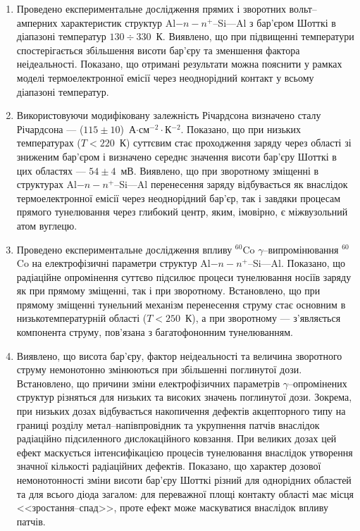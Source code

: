   \begin{enumerate}[leftmargin=0cm,itemindent=3em]
     \item Проведено експериментальне дослідження прямих і зворотних вольт--амперних характеристик структур Al$-n-n^+$--Si---Al з бар'єром Шотткі в діапазоні температур $130\div330$~К.
Виявлено, що при підвищенні температури спостерігається збільшення висоти бар'єру та зменшення фактора неідеальності.
       Показано, що отримані результати можна пояснити у рамках моделі термоелектронної емісії через неоднорідний контакт у всьому діапазоні температур.

     \item Використовуючи модифіковану залежність Річардсона визначено сталу Річардсона --- ($115\pm10$)~А$\cdot$см$^{-2}\cdot$К$^{-2}$.
         Показано, що при низьких температурах ($T<220$~К) суттєвим стає проходження заряду через області зі зниженим бар'єром і визначено середнє значення висоти бар'єру Шотткі в цих областях --- $54\pm4$~мВ.
     Виявлено, що при зворотному зміщенні в структурах Al$-n-n^+$--Si---Al перенесення заряду відбувається як внаслідок термоелектронної емісії через неоднорідний бар'єр, так і завдяки процесам прямого тунелювання через глибокий центр,
          яким, імовірно, є міжвузольний атом вуглецю.

\item Проведено експериментальне дослідження впливу $^{60}$Co $\gamma$--ви\-про\-мі\-ню\-ван\-ня $^{60}$Co на електрофізичні параметри структур Al$-n-n^+$--Si---Al.
     Показано, що радіаційне опромінення суттєво підсилює процеси тунелювання носіїв заряду як при прямому зміщенні, так і при зворотному.
     Встановлено, що при прямому зміщенні тунельний механізм перенесення струму стає основним в низькотемпературній області ($T<250$~К),
а при зворотному --- з'являється компонента струму, пов'язана з багатофононним тунелюванням.


\item Виявлено, що висота бар'єру, фактор неідеальності та величина зворотного струму немонотонно змінюються при збільшенні поглинутої дози.
Встановлено, що причини зміни електрофізичних параметрів $\gamma$--оп\-ро\-мі\-не\-них структур різняться для низьких та високих значень поглинутої дози.
      Зокрема, при низьких дозах відбувається накопичення дефектів акцепторного типу на границі розділу
метал--напівпровідник та укрупнення патчів внаслідок радіаційно підсиленного дислокаційного ковзання.
 При великих дозах цей ефект маскується інтенсифікацією процесів тунелювання внаслідок утворення значної кількості радіаційних дефектів.
Показано, що характер дозової немонотонності зміни висоти бар'єру Шотткі різний для
      однорідних областей та для всього діода загалом:
   для переважної площі контакту області має місця <<зростання--спад>>, проте ефект може маскуватися внаслідок впливу патчів.



\end{enumerate}
